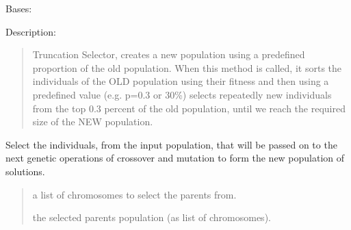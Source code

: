 \documentclass[letterpaper,10pt,english]{sphinxmanual}
\begin{document}
\begin{fulllineitems}
\label{\detokenize{pygenalgo.operators.selection:pygenalgo.operators.selection.truncation_selector.TruncationSelector}}
\pysigstartsignatures
\pysiglinewithargsret
{}
{\sphinxparamcomma {}}
{}
\pysigstopsignatures
\sphinxAtStartPar
Bases: {\hyperref[\detokenize{pygenalgo.operators.selection:pygenalgo.operators.selection.select_operator.SelectionOperator}]{}}

\sphinxAtStartPar
Description:
\begin{quote}

\sphinxAtStartPar
Truncation Selector, creates a new population using a pre\sphinxhyphen{}defined proportion of the old population.
When this method is called, it sorts the individuals of the OLD population using their fitness and
then using a predefined value (e.g. p=0.3 or 30\%) selects repeatedly new individuals from the top
0.3 percent of the old population, until we reach the required size of the NEW population.
\end{quote}

\begin{fulllineitems}
\label{\detokenize{pygenalgo.operators.selection:pygenalgo.operators.selection.truncation_selector.TruncationSelector.select}}
\pysigstartsignatures
\pysiglinewithargsret
{}
{}
{}
\pysigstopsignatures
\sphinxAtStartPar
Select the individuals, from the input population, that will be passed on to the next
genetic operations of crossover and mutation to form the new population of solutions.
\begin{quote}\begin{description}
\sphinxAtStartPar
{} \textendash{} a list of chromosomes to select the parents from.

\sphinxAtStartPar
the selected parents population (as list of chromosomes).

\end{description}\end{quote}

\end{fulllineitems}


\end{fulllineitems}
\end{document}
